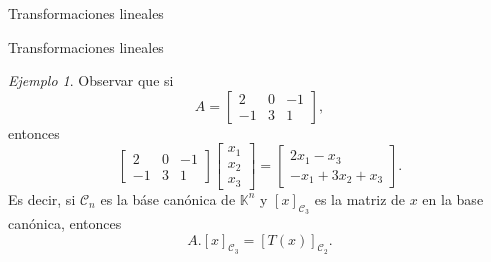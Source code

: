 \documentclass[a4paper,12pt,twoside,spanish,reqno]{amsbook}
\numberwithin{equation}{section}
\theoremstyle{definition}
\theoremstyle{remark}
\newtheorem*{ejemplo*}{Ejemplo}
\newcommand{\K}{\mathbb K}
\begin{document}
\begin{chapter}{Transformaciones lineales}
\begin{section}{Transformaciones lineales}
\begin{ejemplo*}
            Observar que si 
            $$
             A = \begin{bmatrix}
             2&0&-1 \\ -1&3&1
             \end{bmatrix},
            $$
            entonces
            $$
            \begin{bmatrix}
            2&0&-1 \\ -1&3&1
            \end{bmatrix} 
            \begin{bmatrix}
            x_1\\x_2\\x_3
            \end{bmatrix} =
            \begin{bmatrix}
            2x_1 - x_3 \\ -x_1+3x_2+x_3
            \end{bmatrix}.
            $$
            Es decir,  si $\mathcal C_n$  es la báse canónica de $\K^n$ y $[x]_{\mathcal C_3}$ es la matriz de $x$ en la base canónica,  entonces 
            $$
            A.[x]_{\mathcal C_3} = [T(x)]_{\mathcal C_2}.
            $$ 
            \end{ejemplo*}
        

\end{section}
\end{chapter}
\end{document}
